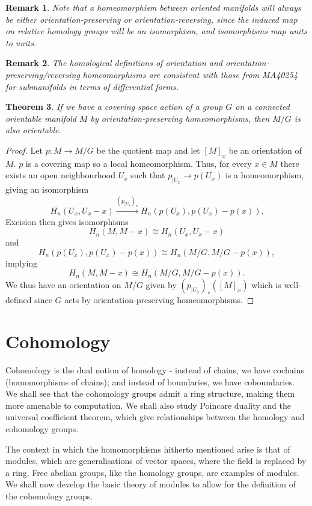 \documentclass{article}
\newtheorem{theorem}{Theorem}[section]
\newtheorem{remark}[theorem]{Remark}
\begin{document}
\begin{remark}
Note that a homeomorphism between oriented manifolds will always be either orientation-preserving or orientation-reversing, since the induced map on relative homology groups will be an isomorphism, and isomorphisms map units to units.
\end{remark}

\begin{remark}
The homological definitions of orientation and orientation-preserving/reversing homeomorphisms are consistent with those from MA40254 for submanifolds in terms of differential forms.
\end{remark}

\begin{theorem}
If we have a covering space action of a group $G$ on a connected orientable manifold $M$ by orientation-preserving homeomorphisms, then $M/G$ is also orientable.
\end{theorem}
\begin{proof}
Let $p:M\to M/G$ be the quotient map and let $[M]_x$ be an orientation of $M$. $p$ is a covering map so a local homeomorphism. Thus, for every $x\in M$ there exists an open neighbourhood $U_x$ such that $p_{|U_x}\to p(U_x)$ is a homeomorphism, giving an isomorphism \[H_n(U_x,U_x-x)\overset{(p_{|U_x})_*}{\longrightarrow}H_n(p(U_x),p(U_x)-p(x)).\] Excision then gives isomorphisms \[H_n(M,M-x)\cong H_n(U_x,U_x-x)\] and \[H_n(p(U_x),p(U_x)-p(x))\cong H_n(M/G,M/G-p(x)),\] implying \[H_n(M,M-x)\cong H_n(M/G,M/G-p(x)).\] We thus have an orientation on $M/G$ given by $(p_{|U_x})_*([M]_x)$ which is well-defined since $G$ acts by orientation-preserving homeomorphisms.
\end{proof}


\section{Cohomology}
Cohomology is the dual notion of homology - instead of chains, we have cochains (homomorphisms of chains); and instead of boundaries, we have coboundaries. We shall see that the cohomology groups admit a ring structure, making them more amenable to computation. We shall also study Poincare duality and the universal coefficient theorem, which give relationships between the homology and cohomology groups.

The context in which the homomorphisms hitherto mentioned arise is that of modules, which are generalisations of vector spaces, where the field is replaced by a ring. Free abelian groups, like the homology groups, are examples of modules. We shall now develop the basic theory of modules to allow for the definition of the cohomology groups.
\end{document}
